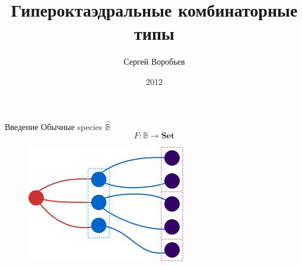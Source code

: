 \documentclass{beamer}
\title{Гипероктаэдральные комбинаторные типы}
\author{Сергей Воробьев}
\institute{Санкт-Петербургский Государственный университет}
\date{2012}
\begin{document}
\begin{frame}
\titlepage
\end{frame}


\begin{frame}{Введение}
Обычные species $\widehat{\mathbb B}$
$$
F\colon \mathbb{B} \rightarrow \mathbf{Set}
$$
\begin{figure}
   \includegraphics{species.jpg}
\end{figure}

\end{frame}
\end{document}
